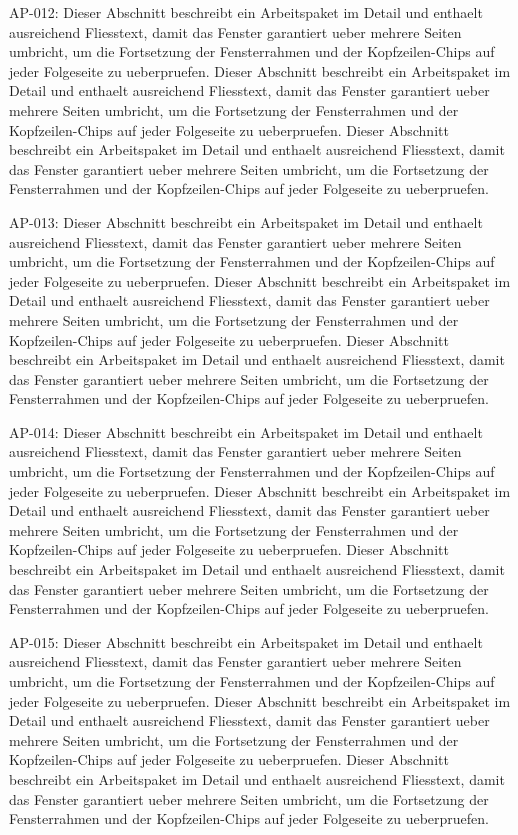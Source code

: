 \documentclass[type=report,theme=dark,language=de]{semio}
\begin{document}
\begin{Table}[title=Lange Tabelle]
AP-012: Dieser Abschnitt beschreibt ein Arbeitspaket im Detail und enthaelt ausreichend Fliesstext, damit das Fenster garantiert ueber mehrere Seiten umbricht, um die Fortsetzung der Fensterrahmen und der Kopfzeilen-Chips auf jeder Folgeseite zu ueberpruefen. Dieser Abschnitt beschreibt ein Arbeitspaket im Detail und enthaelt ausreichend Fliesstext, damit das Fenster garantiert ueber mehrere Seiten umbricht, um die Fortsetzung der Fensterrahmen und der Kopfzeilen-Chips auf jeder Folgeseite zu ueberpruefen. Dieser Abschnitt beschreibt ein Arbeitspaket im Detail und enthaelt ausreichend Fliesstext, damit das Fenster garantiert ueber mehrere Seiten umbricht, um die Fortsetzung der Fensterrahmen und der Kopfzeilen-Chips auf jeder Folgeseite zu ueberpruefen. 

AP-013: Dieser Abschnitt beschreibt ein Arbeitspaket im Detail und enthaelt ausreichend Fliesstext, damit das Fenster garantiert ueber mehrere Seiten umbricht, um die Fortsetzung der Fensterrahmen und der Kopfzeilen-Chips auf jeder Folgeseite zu ueberpruefen. Dieser Abschnitt beschreibt ein Arbeitspaket im Detail und enthaelt ausreichend Fliesstext, damit das Fenster garantiert ueber mehrere Seiten umbricht, um die Fortsetzung der Fensterrahmen und der Kopfzeilen-Chips auf jeder Folgeseite zu ueberpruefen. Dieser Abschnitt beschreibt ein Arbeitspaket im Detail und enthaelt ausreichend Fliesstext, damit das Fenster garantiert ueber mehrere Seiten umbricht, um die Fortsetzung der Fensterrahmen und der Kopfzeilen-Chips auf jeder Folgeseite zu ueberpruefen. 

AP-014: Dieser Abschnitt beschreibt ein Arbeitspaket im Detail und enthaelt ausreichend Fliesstext, damit das Fenster garantiert ueber mehrere Seiten umbricht, um die Fortsetzung der Fensterrahmen und der Kopfzeilen-Chips auf jeder Folgeseite zu ueberpruefen. Dieser Abschnitt beschreibt ein Arbeitspaket im Detail und enthaelt ausreichend Fliesstext, damit das Fenster garantiert ueber mehrere Seiten umbricht, um die Fortsetzung der Fensterrahmen und der Kopfzeilen-Chips auf jeder Folgeseite zu ueberpruefen. Dieser Abschnitt beschreibt ein Arbeitspaket im Detail und enthaelt ausreichend Fliesstext, damit das Fenster garantiert ueber mehrere Seiten umbricht, um die Fortsetzung der Fensterrahmen und der Kopfzeilen-Chips auf jeder Folgeseite zu ueberpruefen. 

AP-015: Dieser Abschnitt beschreibt ein Arbeitspaket im Detail und enthaelt ausreichend Fliesstext, damit das Fenster garantiert ueber mehrere Seiten umbricht, um die Fortsetzung der Fensterrahmen und der Kopfzeilen-Chips auf jeder Folgeseite zu ueberpruefen. Dieser Abschnitt beschreibt ein Arbeitspaket im Detail und enthaelt ausreichend Fliesstext, damit das Fenster garantiert ueber mehrere Seiten umbricht, um die Fortsetzung der Fensterrahmen und der Kopfzeilen-Chips auf jeder Folgeseite zu ueberpruefen. Dieser Abschnitt beschreibt ein Arbeitspaket im Detail und enthaelt ausreichend Fliesstext, damit das Fenster garantiert ueber mehrere Seiten umbricht, um die Fortsetzung der Fensterrahmen und der Kopfzeilen-Chips auf jeder Folgeseite zu ueberpruefen. 


\end{Table}
\end{document}
